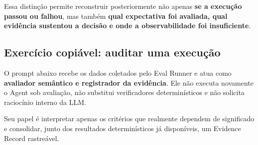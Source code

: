 \documentclass[
  10pt,
  a4paper,
  oneside]{book}
\begin{document}
Essa distinção permite reconstruir posteriormente não apenas \textbf{se
a execução passou ou falhou}, mas também \textbf{qual expectativa foi
avaliada, qual evidência sustentou a decisão e onde a observabilidade
foi insuficiente}.

\hypertarget{exercuxedcio-copiuxe1vel-auditar-uma-execuuxe7uxe3o}{%
\subsection{Exercício copiável: auditar uma
execução}\label{exercuxedcio-copiuxe1vel-auditar-uma-execuuxe7uxe3o}}

O prompt abaixo recebe os dados coletados pelo Eval Runner e atua como
\textbf{avaliador semântico e registrador da evidência}. Ele não executa
novamente o Agent sob avaliação, não substitui verificadores
determinísticos e não solicita raciocínio interno da LLM.

Seu papel é interpretar apenas os critérios que realmente dependem de
significado e consolidar, junto dos resultados determinísticos já
disponíveis, um Evidence Record rastreável.
\end{document}
